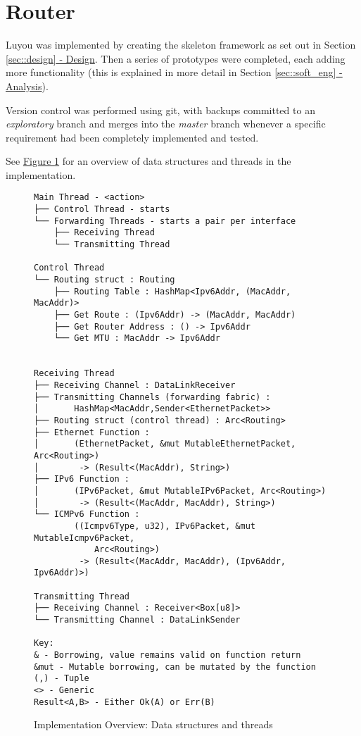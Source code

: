 \documentclass[12pt,a4paper,twoside,openany]{report}
\begin{document}
\pagebreak

\section{Router}
\label{sec::router}

Luyou was implemented by creating the skeleton framework as set out in Section \ref{sec::design}\hyperref[sec::design]{ - Design}.  Then a series of prototypes were completed, each adding more functionality (this is explained in more detail in Section \ref{sec::soft_eng}\hyperref[sec::soft_eng]{ - Analysis}).  

Version control was performed using git\cite{git}, with backups committed to an \textit{exploratory} branch and merges into the \textit{master} branch whenever a specific requirement had been completely implemented and tested.  

See \hyperref[fig::implementation_overview]{Figure }\ref{fig::implementation_overview} for an overview of data structures and threads in the implementation.

\begin{figure}
\begin{lstlisting}[style=tree]
Main Thread - <action>
├── Control Thread - starts
└── Forwarding Threads - starts a pair per interface
    ├── Receiving Thread 
    └── Transmitting Thread

Control Thread
└── Routing struct : Routing
    ├── Routing Table : HashMap<Ipv6Addr, (MacAddr, MacAddr)>
    ├── Get Route : (Ipv6Addr) -> (MacAddr, MacAddr)
    ├── Get Router Address : () -> Ipv6Addr
    └── Get MTU : MacAddr -> Ipv6Addr
    

Receiving Thread
├── Receiving Channel : DataLinkReceiver
├── Transmitting Channels (forwarding fabric) : 
│       HashMap<MacAddr,Sender<EthernetPacket>>
├── Routing struct (control thread) : Arc<Routing>
├── Ethernet Function : 
│       (EthernetPacket, &mut MutableEthernetPacket, Arc<Routing>)
│        -> (Result<(MacAddr), String>)
├── IPv6 Function :
│       (IPv6Packet, &mut MutableIPv6Packet, Arc<Routing>)
│        -> (Result<(MacAddr, MacAddr), String>)
└── ICMPv6 Function :
        ((Icmpv6Type, u32), IPv6Packet, &mut MutableIcmpv6Packet, 
            Arc<Routing>) 
         -> (Result<(MacAddr, MacAddr), (Ipv6Addr, Ipv6Addr)>)

Transmitting Thread
├── Receiving Channel : Receiver<Box[u8]>
└── Transmitting Channel : DataLinkSender

Key:
& - Borrowing, value remains valid on function return
&mut - Mutable borrowing, can be mutated by the function
(,) - Tuple
<> - Generic
Result<A,B> - Either Ok(A) or Err(B)
\end{lstlisting}
\caption{Implementation Overview: Data structures and threads}
\label{fig::implementation_overview}
\end{figure}
\end{document}
